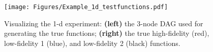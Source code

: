 \documentclass[12pt]{article}
\begin{document}
\begin{figure}
\centering
\begin{minipage}{0.4\textwidth}
    \centering
\end{minipage}
\begin{minipage}{0.4\textwidth}
    \centering
    \texttt{[image: Figures/Example\_1d\_testfunctions.pdf]}
\end{minipage}
\caption{Visualizing the 1-d experiment: \textbf{(left)} the 3-node DAG used for generating the true functions; \textbf{(right)} the true high-fidelity (red),  low-fidelity 1 (blue), and low-fidelity 2 (black) functions.}
\label{fig:1dexperiment}
\end{figure}

\end{document}
